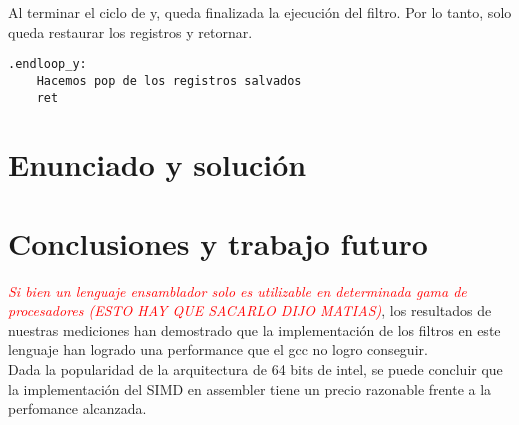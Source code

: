 \documentclass[a4paper]{article}
\begin{document}
\indent Al terminar el ciclo de y, queda finalizada la ejecuci\'on del filtro. Por lo tanto, solo queda restaurar los registros y retornar.
\begin{codesnippet}
\begin{verbatim}
.endloop_y:
    Hacemos pop de los registros salvados
    ret
\end{verbatim}
\end{codesnippet}
\newpage
\section{Enunciado y soluci\'on} 



\section{Conclusiones y trabajo futuro}
\indent\emph{ \textcolor{red}{Si bien un lenguaje ensamblador solo es utilizable en determinada gama de procesadores (ESTO HAY QUE SACARLO DIJO MATIAS)}}, los resultados de nuestras mediciones han demostrado que la implementación de los filtros en este lenguaje han logrado una performance que el gcc no logro conseguir. \\
\indent Dada la popularidad de la arquitectura de 64 bits de intel, se puede concluir que la implementación del SIMD en assembler tiene un precio razonable frente a la perfomance alcanzada.\\
\end{document}

